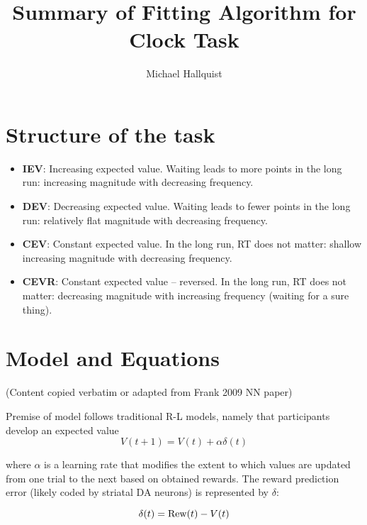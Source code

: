 \documentclass[12pt]{article}
\begin{document}
\title{Summary of Fitting Algorithm for Clock Task}
\author{Michael Hallquist}
\maketitle
\setlength{\parskip}{0cm}
\tableofcontents
\setlength{\parskip}{0.2cm}
\newpage

\section{Structure of the task}

\begin{itemize}
	\item \textbf{IEV}: Increasing expected value. Waiting leads to more points in the long run: increasing magnitude with decreasing frequency.
	\item \textbf{DEV}: Decreasing expected value. Waiting leads to fewer points in the long run: relatively flat magnitude with decreasing frequency.
	\item \textbf{CEV}: Constant expected value. In the long run, RT does not matter: shallow increasing magnitude with decreasing frequency.
	\item \textbf{CEVR}: Constant expected value -- reversed. In the long run, RT does not matter: decreasing magnitude with increasing frequency (waiting for a sure thing).
\end {itemize}
	

\section{Model and Equations}

(Content copied verbatim or adapted from Frank 2009 NN paper)

Premise of model follows traditional R-L models, namely that participants develop an expected value 
\begin{equation}
	V(t + 1) = V(t) + \alpha\delta(t)
\end{equation}

where $\alpha$ is a learning rate that modifies the extent to which values are updated from one trial to the next based on obtained rewards. The reward prediction error (likely coded by striatal DA neurons) is represented by $\delta$:

\begin{equation}
	\delta(t) = \textnormal{Rew}(t) - V(t)
\end{equation}
\end{document}
